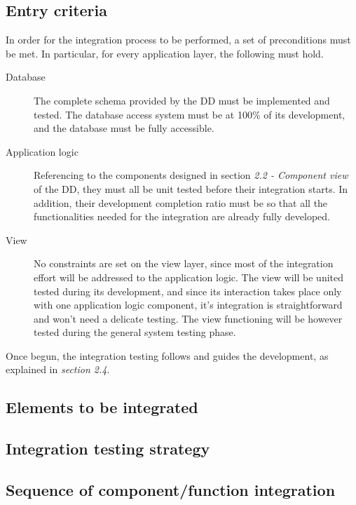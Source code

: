 \subsection{Entry criteria}
	In order for the integration process to be performed, a set of preconditions must be met. In particular, for every application layer, the following must hold.
	\begin{description}
		\item[Database] The complete schema provided by the DD must be implemented and tested. The database access system must be at 100\% of its development, and the database must be fully accessible.
		\item[Application logic] Referencing to the components designed in section \textit{2.2 - Component view} of the DD, they must all be unit tested before their integration starts. In addition, their development completion ratio must be so that all the functionalities needed for the integration are already fully developed. 
		\item[View] No constraints are set on the view layer, since most of the integration effort will be addressed to the application logic. The view will be united tested during its development, and since its interaction takes place only with one application logic component, it's integration is straightforward and won't need a delicate testing. The view functioning will be however tested during the general system testing phase. %
	\end{description}
	Once begun, the integration testing follows and guides the development, as explained in \textit{section 2.4}. %

\subsection{Elements to be integrated}

\subsection{Integration testing strategy}

\subsection{Sequence of component/function integration}
